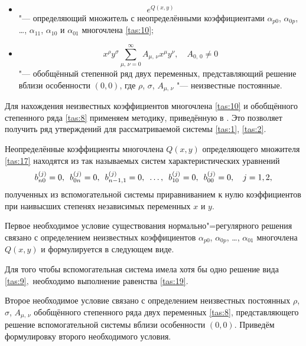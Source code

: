 \begin{itemize}
\item[а)]
\begin{equation} 
e^{Q(x,y)}
\label{tas:17}
\end{equation}
"--- определяющий множитель с неопределёнными коэффициентами $\alpha_{p0}$, $\alpha_{0p}$, \dots, $\alpha_{11}$, $\alpha_{10}$ и $\alpha_{01}$ многочлена \eqref{tas:10};

\item[б)]
\begin{equation}
x^{\rho}   y^{\sigma}    \sum_{\mu,\,\nu=0}^\infty A_{\mu,\,\nu}   x^{\mu}   y^{\nu}, \quad A_{0,\,0}\neq 0
\label{tas:18}
\end{equation}
"--- обобщённый степенной ряд двух переменных, представляющий решение вблизи особенности $(0,0)$, где $\rho$, $\sigma$, $A_{\mu,\,\nu}$ "--- неизвестные
постоянные.


\end{itemize}

Для нахождения неизвестных коэффициентов многочлена \eqref{tas:10} и
обобщённого степенного ряда \eqref{tas:8} применяем методику, приведённую в
\cite{tas:bib:8}. Это позволяет получить ряд  утверждений для рассматриваемой
системы \eqref{tas:1}, \eqref{tas:2}.

Неопределённые коэффициенты многочлена $Q(x,y)$ определяющего множителя \eqref{tas:17} находятся из так называемых систем характеристических уравнений
\begin{equation}
b_{n0}^{(j)}=0, \enskip b_{0n}^{(j)}=0, \enskip b_{n-1,1}^{(j)}=0,
\enskip \dots, \enskip b_{10}^{(j)}=0, \enskip b_{00}^{(j)}=0, \quad
j=1, 2,
\label{tas:19}
\end{equation}
полученных из вспомогательной системы приравниванием к нулю
коэффициентов при наивысших степенях независимых переменных $x$ и
$y$.

Первое необходимое условие существования нормально"=регулярного
решения связано с определением неизвестных коэффициентов
$\alpha_{p0}$, $\alpha_{0p}$, \dots, $\alpha_{01}$ многочлена
$Q(x,y)$ и формулируется в следующем виде.

\smallskip
\begin{theorem}[2]Для того чтобы вспомогательная система имела хотя бы одно решение вида \eqref{tas:9}$,$ необходимо выполнение равенства \eqref{tas:19}{\rm .}
\end{theorem}

\smallskip

Второе необходимое условие связано с определением неизвестных постоянных $\rho$, $\sigma$, $A_{\mu,\,\nu}$  обобщённого степенного ряда двух переменных \eqref{tas:8}, представляющего решение вспомогательной системы вблизи особенности $(0, 0)$. 
Приведём формулировку второго необходимого условия.

